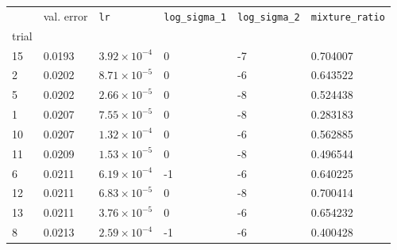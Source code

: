 \begin{tabular}{lp{2.3cm}p{2.3cm}p{2.3cm}p{2.3cm}p{2.3cm}}
\toprule
{} &  val. error &         \texttt{lr} &  \texttt{log\_sigma\_1} &  \texttt{log\_sigma\_2} &  \texttt{mixture\_ratio} \\
trial &             &                     &                         &                         &                          \\
\midrule
15    &      0.0193 & $3.92\times10^{-4}$ &                       0 &                      -7 &                 0.704007 \\
2     &      0.0202 & $8.71\times10^{-5}$ &                       0 &                      -6 &                 0.643522 \\
5     &      0.0202 & $2.66\times10^{-5}$ &                       0 &                      -8 &                 0.524438 \\
1     &      0.0207 & $7.55\times10^{-5}$ &                       0 &                      -8 &                 0.283183 \\
10    &      0.0207 & $1.32\times10^{-4}$ &                       0 &                      -6 &                 0.562885 \\
11    &      0.0209 & $1.53\times10^{-5}$ &                       0 &                      -8 &                 0.496544 \\
6     &      0.0211 & $6.19\times10^{-4}$ &                      -1 &                      -6 &                 0.640225 \\
12    &      0.0211 & $6.83\times10^{-5}$ &                       0 &                      -8 &                 0.700414 \\
13    &      0.0211 & $3.76\times10^{-5}$ &                       0 &                      -6 &                 0.654232 \\
8     &      0.0213 & $2.59\times10^{-4}$ &                      -1 &                      -6 &                 0.400428 \\
\bottomrule
\end{tabular}
